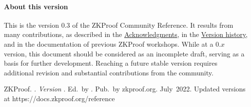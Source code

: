 \paragraph{About this version}%
\label{sec:prelim:about-this-version}\label{sec:prelim:msg-editors}%
This is the version 0.3 of the ZKProof Community Reference.
It results from many contributions, as described in the \hyperref[app:acknowledgments]{Acknowledgments}, in the \hyperref[app:version-history]{Version history}, and in the documentation of previous ZKProof workshops.
While at a 0.$x$ version, this document should be considered as an incomplete draft, serving as a basis for further development.
Reaching a future stable version requires additional revision and substantial contributions from the community.
\loosen


\def\ownciteversion{Version \zkpcomrefversion}
\def\ownciteyear{2022}
\def\owncitemonthNumber{7}
\def\owncitemonthMMM{July}
\def\owncitetag{\ownciteyear:zkproof:\zkpcomrefabbrev-\zkpcomrefversion}
\def\ownciteauthor{ZKProof}
\def\owncitetitle{\zkpcomreftitle}
\def\owncitepublisher{zkproof.org}
\def\owncitenote{Updated versions at https://docs.zkproof.org/reference}

\def\crtab{\textCR~~~}


\def\owncitebibtexcode{@report\{\owncitetag,\crtab
	author = \{\ownciteauthor\},\crtab
	title = \{\owncitetitle\},\crtab
	subtitle = \{\ownciteversion\},\crtab
	year = \{\ownciteyear\},\crtab
	month = \{\owncitemonthNumber\},\crtab
	publisher = \{\owncitepublisher\},\crtab
	editor = \{\editorscurrversion\},\crtab
	keywords = \{cryptography; interoperability; privacy, security; standards; zero-knowledge proofs\}\crtab
	contributors-to-v0 = \{\contributorsToVersionZero\},\crtab
	contributors-to-v01 = \{\contributorsToVersionZeroDotOne\},\crtab
	contributors-to-v02 = \{\contributorsToVersionZeroDotTwo\},\crtab
	contributors-to-v03 = \{\contributorsToVersionZeroDotThree\},\crtab
	addendum = \{\owncitenote\},\crtab
	license = \{Creative Commons Attribution 4.0 International\},\crtab
	shorthand = \{ZkpComref\}\textCR
\}}


\vspace{1.5em}
%
\ownciteauthor. \emph{\owncitetitle. \ownciteversion}.
Ed.\ by \editorscurrversion. Pub.\ by \owncitepublisher. 
\owncitemonthMMM\ \ownciteyear. \owncitenote
